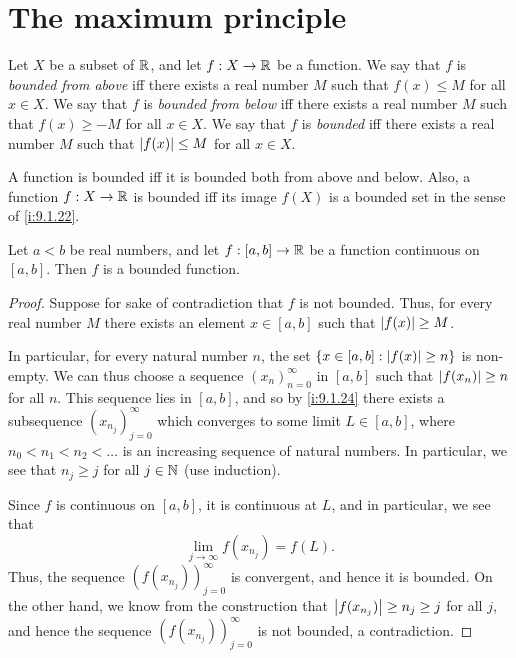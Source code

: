 \section{The maximum principle}\label{i:sec:9.6}

\begin{defn}\label{i:9.6.1}
  Let \(X\) be a subset of \(\mathbb{R}\), and let \(f : X \to \mathbb{R}\) be a function.
  We say that \(f\) is \emph{bounded from above} iff there exists a real number \(M\) such that \(f(x) \leq M\) for all \(x \in X\).
  We say that \(f\) is \emph{bounded from below} iff there exists a real number \(M\) such that \(f(x) \geq -M\) for all \(x \in X\).
  We say that \(f\) is \emph{bounded} iff there exists a real number \(M\) such that \(\left\lvert f(x)\right\rvert \leq M\) for all \(x \in X\).
\end{defn}

\begin{rmk}\label{i:9.6.2}
  A function is bounded iff it is bounded both from above and below.
  Also, a function \(f : X \to \mathbb{R}\) is bounded iff its image \(f(X)\) is a bounded set in the sense of \cref{i:9.1.22}.
\end{rmk}

\begin{lem}\label{i:9.6.3}
  Let \(a < b\) be real numbers, and let \(f : [a, b] \to \mathbb{R}\) be a function continuous on \([a, b]\).
  Then \(f\) is a bounded function.
\end{lem}

\begin{proof}
  Suppose for sake of contradiction that \(f\) is not bounded.
  Thus, for every real number \(M\) there exists an element \(x \in [a, b]\) such that \(\left\lvert f(x)\right\rvert \geq M\).

  In particular, for every natural number \(n\), the set \(\left\lbrace x \in [a, b] : \left\lvert f(x)\right\rvert \geq n\right\rbrace\) is non-empty.
  We can thus choose a sequence \((x_n)_{n = 0}^\infty\) in \([a, b]\) such that \(\left\lvert f(x_n)\right\rvert \geq n\) for all \(n\).
  This sequence lies in \([a, b]\), and so by \cref{i:9.1.24} there exists a subsequence \((x_{n_j})_{j = 0}^\infty\) which converges to some limit \(L \in [a, b]\), where \(n_0 < n_1 < n_2 < \dots\) is an increasing sequence of natural numbers.
  In particular, we see that \(n_j \geq j\) for all \(j \in \mathbb{N}\) (use induction).

  Since \(f\) is continuous on \([a, b]\), it is continuous at \(L\), and in particular, we see that
  \[
    \lim_{j \to \infty} f(x_{n_j}) = f(L).
  \]
  Thus, the sequence \((f(x_{n_j}))_{j = 0}^\infty\) is convergent, and hence it is bounded.
  On the other hand, we know from the construction that \(\left\lvert f(x_{n_j})\right\rvert \geq n_j \geq j\) for all \(j\), and hence the sequence \((f(x_{n_j}))_{j = 0}^\infty\) is not bounded, a contradiction.
\end{proof}

